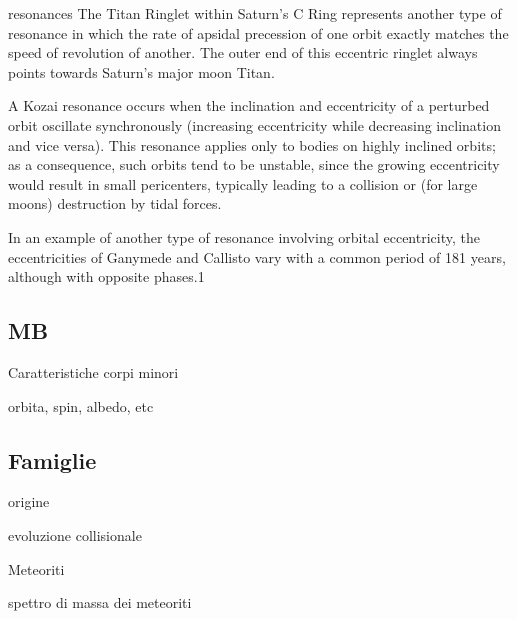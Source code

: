 \begin{itemize}
\begin{frame}[allowframebreaks]{resonances}
The Titan Ringlet within Saturn's C Ring represents another type of resonance in which the rate of apsidal precession of one orbit exactly matches the speed of revolution of another. The outer end of this eccentric ringlet always points towards Saturn's major moon Titan.

A Kozai resonance occurs when the inclination and eccentricity of a perturbed orbit oscillate synchronously (increasing eccentricity while decreasing inclination and vice versa). This resonance applies only to bodies on highly inclined orbits; as a consequence, such orbits tend to be unstable, since the growing eccentricity would result in small pericenters, typically leading to a collision or (for large moons) destruction by tidal forces.

In an example of another type of resonance involving orbital eccentricity, the eccentricities of Ganymede and Callisto vary with a common period of 181 years, although with opposite phases.1
\end{frame}


\subsection{MB}

\begin{frame}{Caratteristiche corpi minori}

\end{frame}

\begin{wordonframe}{orbita, spin, albedo, etc}

\end{wordonframe}

\subsection{Famiglie}

\begin{frame}{origine}

\end{frame}

\begin{wordonframe}{evoluzione collisionale}

\end{wordonframe}

\begin{frame}{Meteoriti}

\end{frame}

\begin{wordonframe}{spettro di massa dei meteoriti}


\end{wordonframe}
\end{itemize}
